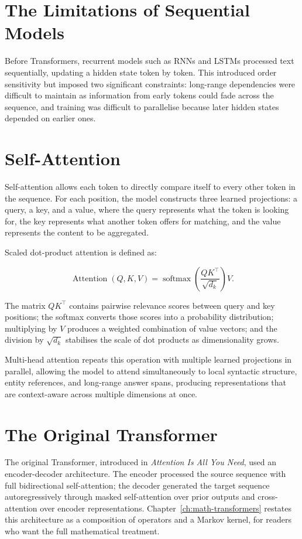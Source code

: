 \section{The Limitations of Sequential Models}

Before Transformers, recurrent models such as RNNs and LSTMs processed text
sequentially, updating a hidden state token by token. This introduced order sensitivity
but imposed two significant constraints: long-range dependencies were difficult to
maintain as information from early tokens could fade across the sequence, and training
was difficult to parallelise because later hidden states depended on earlier ones.

\section{Self-Attention}

Self-attention allows each token to directly compare itself to every other token in the
sequence. For each position, the model constructs three learned projections: a query, a
key, and a value, where the query represents what the token is looking for, the key
represents what another token offers for matching, and the value represents the content
to be aggregated.

Scaled dot-product attention is defined as:

\[
\operatorname{Attention}(Q,K,V)
= \operatorname{softmax}\!\left(\frac{QK^{\top}}{\sqrt{d_k}}\right)V.
\]

The matrix $QK^{\top}$ contains pairwise relevance scores between query and key
positions; the softmax converts those scores into a probability distribution; multiplying
by $V$ produces a weighted combination of value vectors; and the division by
$\sqrt{d_k}$ stabilises the scale of dot products as dimensionality grows.

Multi-head attention repeats this operation with multiple learned projections in
parallel, allowing the model to attend simultaneously to local syntactic structure,
entity references, and long-range answer spans, producing representations that are
context-aware across multiple dimensions at once.

\section{The Original Transformer}

The original Transformer, introduced in \emph{Attention Is All You Need}, used an
encoder-decoder architecture. The encoder processed the source sequence with full
bidirectional self-attention; the decoder generated the target sequence autoregressively
through masked self-attention over prior outputs and cross-attention over encoder
representations.
Chapter~\ref{ch:math-transformers} restates this architecture as a composition
of operators and a Markov kernel, for readers who want the full mathematical treatment.

